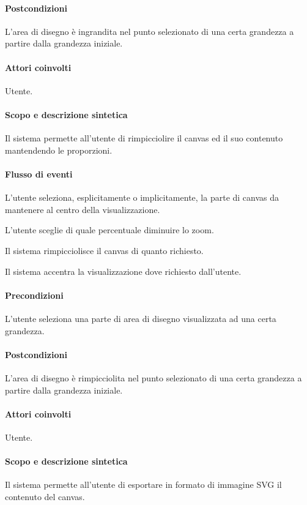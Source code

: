 \paragraph{Postcondizioni} L'area di disegno \`e ingrandita nel punto selezionato di una certa grandezza a partire dalla grandezza iniziale.

\paragraph{Attori coinvolti} Utente.
\paragraph{Scopo e descrizione sintetica} 
Il sistema permette all'utente di rimpicciolire il canvas ed il suo contenuto mantendendo le proporzioni.
\paragraph{Flusso di eventi}
\begin{elenconumerato}[\textbf{}]{\subsubsecindent}
\item L'utente seleziona, esplicitamente o implicitamente, la parte di canvas da mantenere al centro della visualizzazione.
\item L'utente sceglie di quale percentuale diminuire lo zoom.
\item Il sistema rimpicciolisce il canvas di quanto richiesto.
\item Il sistema accentra la visualizzazione dove richiesto dall'utente.
\end{elenconumerato}
\paragraph{Precondizioni} L'utente seleziona una parte di area di disegno visualizzata ad una certa grandezza.
\paragraph{Postcondizioni} L'area di disegno \`e rimpicciolita nel punto selezionato di una certa grandezza a partire dalla grandezza iniziale.
\paragraph{Attori coinvolti} Utente.
\paragraph{Scopo e descrizione sintetica} 
Il sistema permette all'utente di esportare in formato di immagine SVG il contenuto del canvas.
